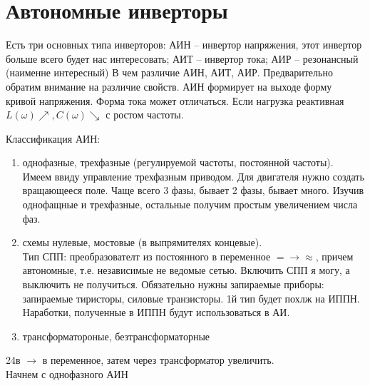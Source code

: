 \section{Автономные инверторы}

Есть три основных типа инверторов: АИН -- инвертор напряжения, этот инвертор больше всего будет нас интересовать; АИТ -- инвертор тока; АИР -- резонансный (наименне интересный)
В чем различие АИН, АИТ, АИР. Предварительно обратим внимание на различие свойств.
АИН формирует на выходе форму кривой напряжения. Форма тока может отличаться. Если нагрузка реактивная $L(\omega)\nearrow, C(\omega)\searrow$ с ростом частоты. 

Классификация АИН:
\begin{enumerate}
\item однофазные, трехфазные (регулируемой частоты, постоянной частоты). Имеем ввиду управление трехфазным приводом. Для двигателя нужно создать 
вращающееся поле. Чаще всего 3 фазы, бывает 2 фазы, бывает много. Изучив однофащные и трехфазные, остальные получим простым увеличением числа фаз.

\item схемы нулевые, мостовые (в выпрямителях концевые).\\
Тип СПП: преобразователт из постоянного в переменное $=\rightarrow\approx$, причем автономные, т.е. независимые не ведомые сетью. Включить СПП я могу, а выключить не
получиться. Обязательно нужны запираемые приборы: запираемые тиристоры, силовые транзисторы.
1й тип будет похлж на ИППН. Наработки, полученные в ИППН будут использоваться в АИ.
\item трансформатороные, безтрансформаторные
\end{enumerate}
24в $\rightarrow$ в переменное, затем через трансформатор увеличить.\\

Начнем с однофазного АИН

